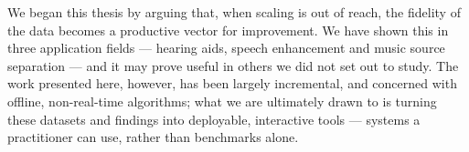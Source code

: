 \vspace{1cm}

We began this thesis by arguing that, when scaling is out of reach, the fidelity
of the data becomes a productive vector for improvement. We have shown this in
three application fields --- hearing aids, speech enhancement and music source
separation --- and it may prove useful in others we did not set out to study. The
work presented here, however, has been largely incremental, and concerned with
offline, non-real-time algorithms; what we are ultimately drawn to is turning
these datasets and findings into deployable, interactive tools --- systems a
practitioner can use, rather than benchmarks alone.